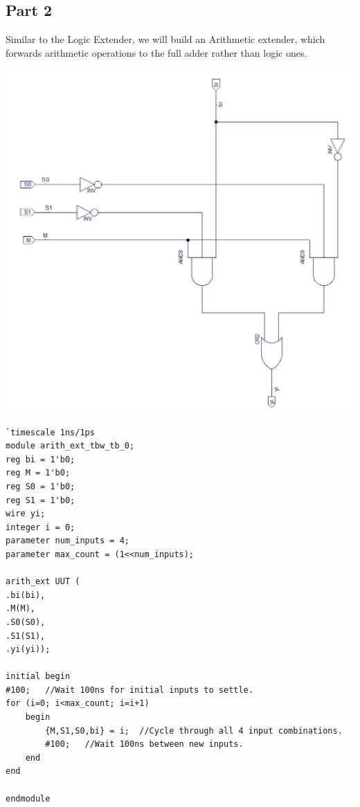 \documentclass[12pt]{article}
\begin{document}
	\newpage
	\subsection{Part 2}
		Similar to the Logic Extender, we will build an Arithmetic extender, which forwards arithmetic operations to the full adder rather than logic ones.
		
		\begin{center}
			\includegraphics[scale=.5]{arith_ext_sch.png}
		\end{center}

		\begin{Verbatim}[frame=single, fontsize=\small]
`timescale 1ns/1ps 
module arith_ext_tbw_tb_0;     
reg bi = 1'b0;     
reg M = 1'b0;     
reg S0 = 1'b0;     
reg S1 = 1'b0;     
wire yi;     
integer i = 0;    
parameter num_inputs = 4;     
parameter max_count = (1<<num_inputs); 
 
arith_ext UUT (     
.bi(bi),     
.M(M),     
.S0(S0),     
.S1(S1),     
.yi(yi)); 
  
initial begin     
#100;   //Wait 100ns for initial inputs to settle.      
for (i=0; i<max_count; i=i+1)           
	begin             
		{M,S1,S0,bi} = i;  //Cycle through all 4 input combinations.             
		#100;   //Wait 100ns between new inputs.         
	end 
end 
 
endmodule 
			
		\end{Verbatim}
\end{document}
